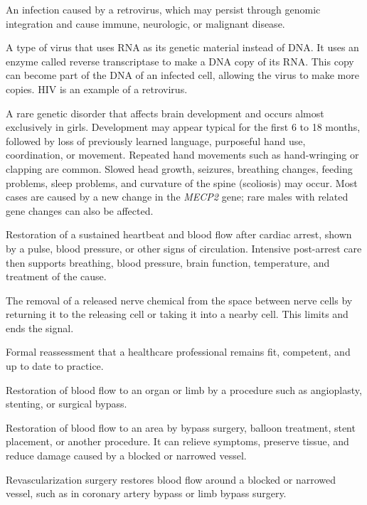  An infection caused by a retrovirus, which may persist through genomic integration and cause immune, neurologic, or malignant disease.

 A type of virus that uses RNA as its genetic material instead of DNA. It uses an enzyme called reverse transcriptase to make a DNA copy of its RNA. This copy can become part of the DNA of an infected cell, allowing the virus to make more copies. HIV is an example of a retrovirus.

 A rare genetic disorder that affects brain development and occurs almost exclusively in girls. Development may appear typical for the first 6 to 18 months, followed by loss of previously learned language, purposeful hand use, coordination, or movement. Repeated hand movements such as hand-wringing or clapping are common. Slowed head growth, seizures, breathing changes, feeding problems, sleep problems, and curvature of the spine (scoliosis) may occur. Most cases are caused by a new change in the \textit{MECP2} gene; rare males with related gene changes can also be affected.

 Restoration of a sustained heartbeat and blood flow after cardiac arrest, shown by a pulse, blood pressure, or other signs of circulation. Intensive post-arrest care then supports breathing, blood pressure, brain function, temperature, and treatment of the cause.

 The removal of a released nerve chemical from the space between nerve cells by returning it to the releasing cell or taking it into a nearby cell. This limits and ends the signal.

 Formal reassessment that a healthcare professional remains fit, competent, and up to date to practice.

 Restoration of blood flow to an organ or limb by a procedure such as angioplasty, stenting, or surgical bypass.

 Restoration of blood flow to an area by bypass surgery, balloon treatment, stent placement, or another procedure. It can relieve symptoms, preserve tissue, and reduce damage caused by a blocked or narrowed vessel.

 Revascularization surgery restores blood flow around a blocked or narrowed vessel, such as in coronary artery bypass or limb bypass surgery.

